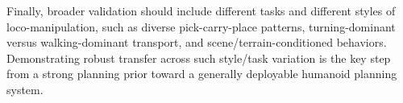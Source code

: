 Finally, broader validation should include different tasks and different styles of loco-manipulation, such as diverse pick-carry-place patterns, turning-dominant versus walking-dominant transport, and scene/terrain-conditioned behaviors. Demonstrating robust transfer across such style/task variation is the key step from a strong planning prior toward a generally deployable humanoid planning system.
